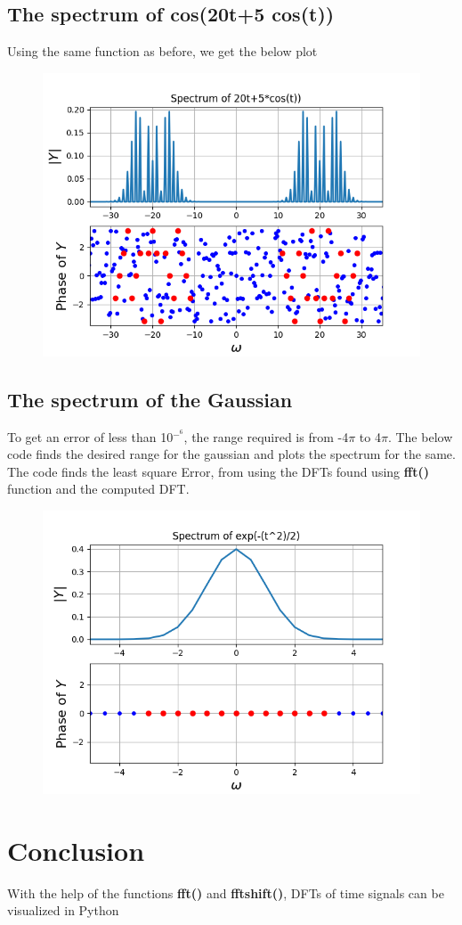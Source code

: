 \documentclass[12pt, a4paper]{report}
\begin{document}
\subsection{The spectrum of cos(20t+5 cos(t))}
Using the same function as before, we get the below plot
\noindent
\begin{figure}[h!]
    \centering
    \includegraphics[scale=0.75]{fig5.png} 
    \caption{}
    \label{fig:my_label}
\end{figure}
\subsection{The spectrum of the Gaussian }
To get an error of less than 10$^-^6$, the range required is from -4$\pi$ to 4$\pi$. The below code finds the desired range for the gaussian and plots the spectrum for the same. The code finds the least square Error, from using the DFTs found using \textbf{fft()} function and the computed DFT.
\noindent

\begin{figure}[h!]
    \centering
    \includegraphics[scale=0.7]{fig6.png} 
    \caption{}
    \label{fig:my_label}
\end{figure}

\section{Conclusion}
With the help of the functions \textbf{fft()} and \textbf{fftshift()}, DFTs of time signals can be visualized in Python
\end{document}
